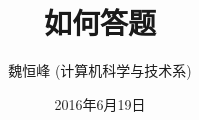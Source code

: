 \documentclass[UTF8, a4paper]{ctexart}
\begin{document}
\title{如何答题}
\author{魏恒峰 (计算机科学与技术系)}
\date{2016年6月19日}
\maketitle






\end{document}
